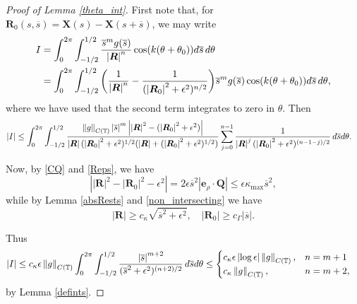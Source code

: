 \documentclass[11pt]{article}
\numberwithin{equation}{section}
\newcommand{\T}{\mathbb{T}}
\newcommand{\bars}{\overline s}
\newcommand{\X}{\bm{X}}
\newcommand{\be}{\bm{e}}
\newcommand{\ts}{\thinspace}
\newcommand{\abs}[1]{\left\lvert #1 \right\rvert}
\newcommand{\norm}[1]{\left\lVert #1 \right\rVert}
\theoremstyle{definition}
\begin{document}
\begin{proof}[Proof of Lemma \ref{theta_int}]
First note that, for $\bm{R}_0(s,\bars)=\X(s) - \X(s+\bars)$, we may write
\begin{equation}
\begin{aligned}
I &=\int_0^{2\pi}\int_{-1/2}^{1/2}\frac{\bars^m g(\bars)}{\abs{\bm{R}}^n}\cos(k(\theta+\theta_0))d\bars \ts d\theta \\
&= \int_0^{2\pi}\int_{-1/2}^{1/2}\bigg(\frac{1}{\abs{\bm{R}}^n}-\frac{1}{(\abs{\bm{R}_0}^2+\epsilon^2)^{n/2}} \bigg)\bars^m g(\bars)\cos(k(\theta+\theta_0))d\bars \ts d\theta,
\end{aligned}
\end{equation}
where we have used that the second term integrates to zero in $\theta$. Then
\begin{align*}
\abs{I} &\le \int_0^{2\pi}\int_{-1/2}^{1/2}\frac{\norm{g}_{C(\T)}\abs{\bars}^m\abs{\abs{\bm{R}}^2-(\abs{\bm{R}_0}^2+\epsilon^2)}}{\abs{\bm{R}}(\abs{\bm{R}_0}^2+\epsilon^2)^{1/2}(\abs{\bm{R}}+(\abs{\bm{R}_0}^2+\epsilon^2)^{1/2})} \sum_{j=0}^{n-1}\frac{1}{\abs{\bm{R}}^j(\abs{\bm{R}_0}^2+\epsilon^2)^{(n-1-j)/2}} \ts d\bars d\theta.
\end{align*}

Now, by \eqref{CQ} and \eqref{Reps}, we have
\[ \abs{\abs{\bm{R}}^2-\abs{\bm{R}_0}^2-\epsilon^2}=2\epsilon\bars^2\abs{\be_\rho\cdot\bm{Q}}\le \epsilon \kappa_{\max}\bars^2,\]
while by Lemma \ref{absRests} and \eqref{non_intersecting} we have
\[ \abs{\bm{R}}\ge c_\kappa\sqrt{\bars^2+\epsilon^2}, \quad \abs{\bm{R}_0}\ge c_\Gamma\abs{\bars}.\]

Thus
\begin{align*}
\abs{I}&\le c_\kappa \epsilon \norm{g}_{C(\T)}\int_0^{2\pi}\int_{-1/2}^{1/2}\frac{\abs{\bars}^{m+2}}{(\bars^2+\epsilon^2)^{(n+2)/2}} \ts d\bars d\theta \le \begin{cases}
 c_\kappa \epsilon\abs{\log\epsilon}\norm{g}_{C(\T)}, & n=m+1 \\
 c_\kappa \norm{g}_{C(\T)}, & n=m+2,
 \end{cases}
\end{align*}
by Lemma \ref{defints}.

\end{proof}


\end{document}
